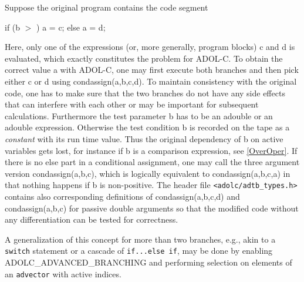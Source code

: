 \documentclass[11pt,twoside]{article}
\begin{document}
Suppose the original program contains the code segment
\begin{center}
{\sf if (b \boldmath $>$ ) a = c; else a = d;}\\
\end{center}
Here, only one of the expressions (or, more generally, program blocks)
{\sf c} and {\sf d} is evaluated, which exactly constitutes the problem
for ADOL-C. To obtain the correct value {\sf a} with ADOL-C, one
may first execute both branches and then pick either {\sf c}
or {\sf d} using 
{\sf condassign(a,b,c,d)}. To maintain
consistency with the original code, one has to make sure
that the two branches do not have any side effects that can
interfere with each other or may be important for subsequent
calculations. Furthermore the test parameter {\sf b} has to be an 
{\sf adouble} or an {\sf adouble} expression. Otherwise the 
test condition {\sf b} is recorded on the tape as a {\em constant} with its
run time value. Thus the original dependency of {\sf b} on 
active variables gets lost, for instance if {\sf b} is a comparison 
expression, see \autoref{OverOper}. 
If there is no {\sf else} part in a conditional assignment, one may call
the three argument version 
{\sf condassign(a,b,c)}, which 
is logically equivalent to {\sf condassign(a,b,c,a)} in that
nothing happens if {\sf b} is non-positive.  
The header file \verb=<adolc/adtb_types.h>=
contains also corresponding definitions of
{\sf condassign(a,b,c,d)} 
and {\sf condassign(a,b,c)} for
passive {\sf double} arguments so that the modified code 
without any differentiation can be tested
for correctness. 

A generalization of this concept for more than two branches, e.g.,
akin to a \texttt{switch} statement or a cascade of \texttt{if...else if}, may be done by enabling
\textsf{ADOLC\_ADVANCED\_BRANCHING} and performing selection on
elements of an \texttt{advector} with active indices.
%
\end{document}
